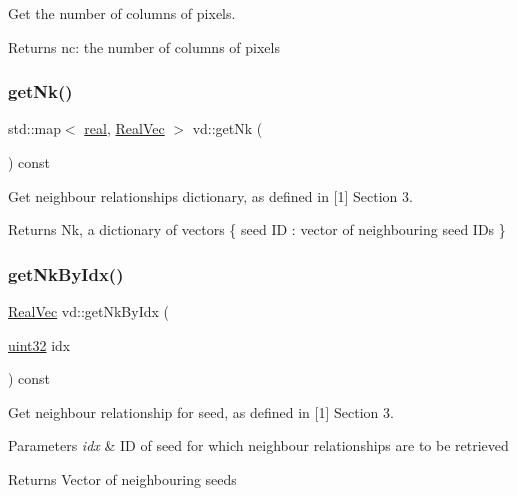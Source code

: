 Get the number of columns of pixels. 

\begin{DoxyReturn}{Returns}
nc\+: the number of columns of pixels 
\end{DoxyReturn}
\mbox{\label{classvd_a90613fc46f246a5450e26487caff33f9}} 
\subsubsection{\texorpdfstring{get\+Nk()}{getNk()}}
{\footnotesize\ttfamily std\+::map$<$ \mbox{\hyperlink{typedefs_8h_a58a0c7cf2501f4492da833421be92547}{real}}, \mbox{\hyperlink{typedefs_8h_a84b6d9a0fbb45e01ad4a3aa5667f2992}{Real\+Vec}} $>$ vd\+::get\+Nk (\begin{DoxyParamCaption}{ }\end{DoxyParamCaption}) const}



Get neighbour relationships dictionary, as defined in \mbox{[}1\mbox{]} Section 3. 

\begin{DoxyReturn}{Returns}
Nk, a dictionary of vectors \{ seed ID \+: vector of neighbouring seed I\+Ds \} 
\end{DoxyReturn}
\mbox{\label{classvd_a4d058d2d1d675a741a83776c95b2acfb}} 
\subsubsection{\texorpdfstring{get\+Nk\+By\+Idx()}{getNkByIdx()}}
{\footnotesize\ttfamily \mbox{\hyperlink{typedefs_8h_a84b6d9a0fbb45e01ad4a3aa5667f2992}{Real\+Vec}} vd\+::get\+Nk\+By\+Idx (\begin{DoxyParamCaption}\item[{\mbox{\hyperlink{typedefs_8h_a8ad23e2333787a214e20a58a284a5a60}{uint32}}}]{idx }\end{DoxyParamCaption}) const}



Get neighbour relationship for seed, as defined in \mbox{[}1\mbox{]} Section 3. 


\begin{DoxyParams}{Parameters}
{\em idx} & ID of seed for which neighbour relationships are to be retrieved \\
\hline
\end{DoxyParams}
\begin{DoxyReturn}{Returns}
Vector of neighbouring seeds 
\end{DoxyReturn}
\mbox{\label{classvd_afda5d6b3eb04899e1b31c5ee3a3af527}} 
